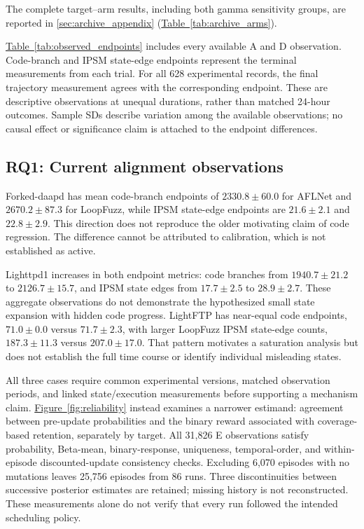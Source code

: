 \documentclass[final,5p,times,number]{elsarticle}
\newcommand{\namedref}[2]{\hyperref[#2]{#1~\ref*{#2}}}
\begin{document}

The complete target--arm results, including both gamma sensitivity groups, are reported in \ref{sec:archive_appendix} (\namedref{Table}{tab:archive_arms}).

\namedref{Table}{tab:observed_endpoints} includes every available A and D observation. Code-branch and IPSM state-edge endpoints represent the terminal measurements from each trial. For all 628 experimental records, the final trajectory measurement agrees with the corresponding endpoint. These are descriptive observations at unequal durations, rather than matched 24-hour outcomes. Sample SDs describe variation among the available observations; no causal effect or significance claim is attached to the endpoint differences.

\subsection{RQ1: Current alignment observations}
Forked-daapd has mean code-branch endpoints of $2330.8\pm60.0$ for AFLNet and $2670.2\pm87.3$ for LoopFuzz, while IPSM state-edge endpoints are $21.6\pm2.1$ and $22.8\pm2.9$. This direction does not reproduce the older motivating claim of code regression. The difference cannot be attributed to calibration, which is not established as active.

Lighttpd1 increases in both endpoint metrics: code branches from $1940.7\pm21.2$ to $2126.7\pm15.7$, and IPSM state edges from $17.7\pm2.5$ to $28.9\pm2.7$. These aggregate observations do not demonstrate the hypothesized small state expansion with hidden code progress. LightFTP has near-equal code endpoints, $71.0\pm0.0$ versus $71.7\pm2.3$, with larger LoopFuzz IPSM state-edge counts, $187.3\pm11.3$ versus $207.0\pm17.0$. That pattern motivates a saturation analysis but does not establish the full time course or identify individual misleading states.

All three cases require common experimental versions, matched observation periods, and linked state/execution measurements before supporting a mechanism claim. \namedref{Figure}{fig:reliability} instead examines a narrower estimand: agreement between pre-update probabilities and the binary reward associated with coverage-based retention, separately by target. All 31,826 E observations satisfy probability, Beta-mean, binary-response, uniqueness, temporal-order, and within-episode discounted-update consistency checks. Excluding 6,070 episodes with no mutations leaves 25,756 episodes from 86 runs. Three discontinuities between successive posterior estimates are retained; missing history is not reconstructed. These measurements alone do not verify that every run followed the intended scheduling policy.
\end{document}
